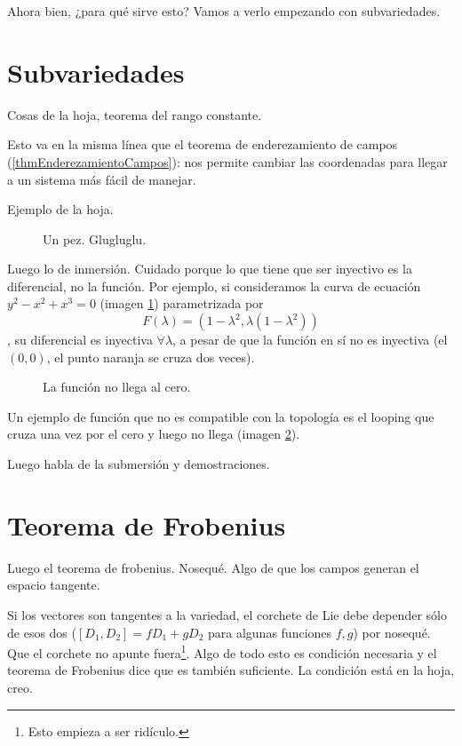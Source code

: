 Ahora bien, ¿para qué sirve esto? Vamos a verlo empezando con subvariedades.

\section{Subvariedades}

Cosas de la hoja, teorema del rango constante.

Esto va en la misma línea que el teorema de enderezamiento de campos (\ref{thmEnderezamientoCampos}): nos permite cambiar las coordenadas para llegar a un sistema más fácil de manejar.

Ejemplo de la hoja.

\begin{figure}
\centering
{}
\caption{Un pez. Glugluglu.}
\label{figPez}
\end{figure}

Luego lo de inmersión. Cuidado porque lo que tiene que ser inyectivo es la diferencial, no la función. Por ejemplo, si consideramos la curva de ecuación $y^2 - x^2 + x^3 = 0$ (imagen \ref{figPez}) parametrizada por \[ F(λ) = (1-λ^2, λ(1-λ^2)) \], su diferencial es inyectiva $∀λ$, a pesar de que la función en sí no es inyectiva (el $(0,0)$, el punto naranja se cruza dos veces).


\begin{figure}
\centering
{}
\caption{La función no llega al cero.}
\label{figBucleCero}
\end{figure}

Un ejemplo de función que no es compatible con la topología es el looping que cruza una vez por el cero y luego no llega (imagen \ref{figBucleCero}).

Luego habla de la submersión y demostraciones.

\section{Teorema de Frobenius}

Luego el teorema de frobenius. Nosequé. Algo de que los campos generan el espacio tangente.

Si los vectores son tangentes a la variedad, el corchete de Lie debe depender sólo de esos dos ($[D_1, D_2] = fD_1 + gD_2$ para algunas funciones $f,g$) por nosequé. Que el corchete no apunte fuera\footnote{Esto empieza a ser ridículo.}. Algo de todo esto es condición necesaria y el teorema de Frobenius dice que es también suficiente. La condición está en la hoja, creo.

